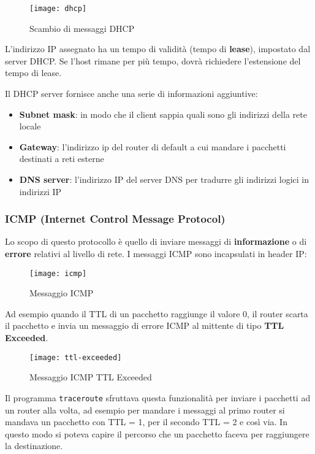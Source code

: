 \documentclass[a4paper]{article}
\begin{document}
\begin{figure}[H]
  \centering
  \texttt{[image: dhcp]}
  \caption{Scambio di messaggi DHCP}
\end{figure}

\noindent
L'indirizzo IP assegnato ha un tempo di validità (tempo di \textbf{lease}), impostato 
dal server DHCP. Se l'host rimane per più tempo, dovrà richiedere l'estensione del
tempo di lease.

\vspace{1em}
\noindent
Il DHCP server fornisce anche una serie di informazioni aggiuntive:
\begin{itemize}
  \item \textbf{Subnet mask}: in modo che il client sappia quali sono gli indirizzi
    della rete locale
  \item \textbf{Gateway}: l'indirizzo ip del router di default a cui mandare i pacchetti
    destinati a reti esterne
  \item \textbf{DNS server}: l'indirizzo IP del server DNS per tradurre gli indirizzi
    logici in indirizzi IP
\end{itemize}

\subsubsection{ICMP (Internet Control Message Protocol)}
Lo scopo di questo protocollo è quello di inviare messaggi di \textbf{informazione} o di
\textbf{errore} relativi al livello di rete. I messaggi ICMP sono incapsulati in header
IP:
\begin{figure}[H]
  \centering
  \texttt{[image: icmp]}
  \caption{Messaggio ICMP}
\end{figure}

\begin{example}
  Ad esempio quando il TTL di un pacchetto raggiunge il valore 0, il router scarta il
  pacchetto e invia un messaggio di errore ICMP al mittente di tipo \textbf{TTL Exceeded}.
  \begin{figure}[H]
    \centering
    \texttt{[image: ttl-exceeded]}
    \caption{Messaggio ICMP TTL Exceeded}
  \end{figure}

  \noindent
  Il programma \texttt{traceroute} sfruttava questa funzionalità per inviare i pacchetti
  ad un router alla volta, ad esempio per mandare i messaggi al primo router si mandava
  un pacchetto con TTL = 1, per il secondo TTL = 2 e così via. In questo modo si poteva
  capire il percorso che un pacchetto faceva per raggiungere la destinazione.
\end{example}
\end{document}
